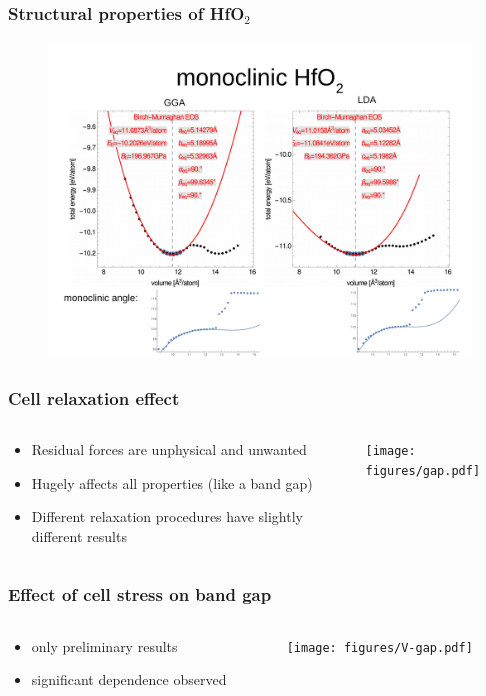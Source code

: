 \documentclass{beamer}
\begin{document}
\begin{frame}
    \frametitle{Structural properties of HfO$_2$}
   \vspace{-0.4cm}
         \begin{figure}
	\includegraphics[width=0.9\linewidth]{figures/HfO2-monoclinic.pdf}
	\end{figure} 
\end{frame}

\begin{frame}
    \frametitle{Cell relaxation effect}
	\begin{columns}
	\begin{column}{0.4\linewidth}
		\begin{itemize}
			\item Residual forces are unphysical and unwanted
			\item Hugely affects all properties (like a band gap)
			\item Different relaxation procedures have slightly different results
		\end{itemize}
	\end{column}
	\begin{column}{0.6\linewidth}
		\texttt{[image: figures/gap.pdf]}
	\end{column}
	\end{columns}

\end{frame}

\begin{frame}
    \frametitle{Effect of cell stress on band gap}
	\begin{columns}
	\begin{column}{0.4\linewidth}
		\begin{itemize}
			\item only preliminary results 
			\item significant dependence observed
		\end{itemize}
	\end{column}
	\begin{column}{0.6\linewidth}
		\texttt{[image: figures/V-gap.pdf]}
	\end{column}
	\end{columns}
\end{frame}
\end{document}
